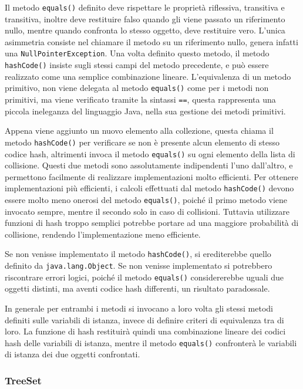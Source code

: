 \documentclass{article}
\numberwithin{equation}{subsection}
\begin{document}
Il metodo \verb|equals()| definito deve rispettare le proprietà riflessiva, transitiva e transitiva, inoltre deve restituire falso quando gli viene passato un riferimento nullo, 
mentre quando confronta lo stesso oggetto, deve restituire vero. L'unica asimmetria consiste nel chiamare il metodo su un riferimento nullo, genera infatti una 
\verb|NullPointerException|. Una volta definito questo metodo, il metodo \verb|hashCode()| insiste sugli stessi campi del metodo precedente, e può essere realizzato come una 
semplice combinazione lineare.  
L'equivalenza di un metodo primitivo, non viene delegata al metodo \verb|equals()| come per i metodi non primitivi, ma viene verificato tramite la sintassi \verb|==|, questa 
rappresenta una piccola ineleganza del linguaggio Java, nella sua gestione dei metodi primitivi. 


Appena viene aggiunto un nuovo elemento alla collezione, questa chiama il metodo \verb|hashCode()| per verificare se non è presente alcun elemento di stesso codice hash, 
altrimenti invoca il metodo \verb|equals()| su ogni elemento della lista di collisione. 
Questi due metodi sono assolutamente indipendenti l'uno dall'altro, e permettono facilmente di realizzare implementazioni molto efficienti. 
Per ottenere implementazioni più efficienti, i calcoli effettuati dal metodo \verb|hashCode()| devono essere molto meno onerosi del metodo \verb|equals()|, poiché il primo 
metodo viene invocato sempre, mentre il secondo solo in caso di collisioni. 
Tuttavia utilizzare funzioni di hash troppo semplici potrebbe portare ad una maggiore probabilità di collisione, rendendo l'implementazione meno efficiente. 

Se non venisse implementato il metodo \verb|hashCode()|, si erediterebbe quello definito da \verb|java.lang.Object|. Se non venisse implementato si potrebbero riscontrare errori logici, 
poiché il metodo \verb|equals()| considererebbe uguali due oggetti distinti, ma aventi codice hash differenti, un risultato paradossale. 

In generale per entrambi i metodi si invocano a loro volta gli stessi metodi definiti sulle variabili di istanza, invece di definire criteri di equivalenza tra di loro. La funzione di hash 
restituirà quindi una combinazione lineare dei codici hash delle variabili di istanza, mentre il metodo \verb|equals()| confronterà le variabili di istanza dei due oggetti confrontati. 

\subsubsection{TreeSet}
\end{document}
